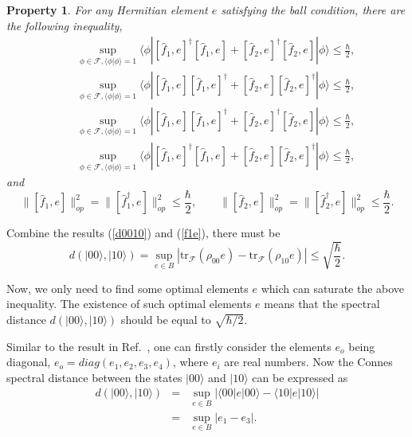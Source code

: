 \documentclass[a4paper,12pt]{article}
\newtheorem{property}{Property}
\begin{document}
\begin{property}
	For any Hermitian element $e$ satisfying the ball condition, there are the following inequality,
	\begin{eqnarray}\label{bc2}
		&&\sup_{\phi\in\mathcal{F},\langle\phi|\phi\rangle=1}
		\!\!\!\!\!\!\langle\phi|[\hat{f}_1,e]^\dag[\hat{f}_1,e]+[\hat{f}_2,e]^\dag[\hat{f}_2,e]|\phi\rangle
		\leqslant\frac{\hbar}{2},
		\nonumber\\
		&&\sup_{\phi\in\mathcal{F},\langle\phi|\phi\rangle=1}
		\!\!\!\!\!\!\langle\phi|[\hat{f}_1,e][\hat{f}_1,e]^\dag+[\hat{f}_2,e][\hat{f}_2,e]^\dag|\phi\rangle
		\leqslant\frac{\hbar}{2},
		\nonumber\\
		&&\sup_{\phi\in\mathcal{F},\langle\phi|\phi\rangle=1}
		\!\!\!\!\!\!\langle\phi|[\hat{f}_1,e][\hat{f}_1,e]^\dag+[\hat{f}_2,e]^\dag[\hat{f}_2,e]|\phi\rangle
		\leqslant\frac{\hbar}{2},\nonumber\\
		&&\sup_{\phi\in\mathcal{F},\langle\phi|\phi\rangle=1}
		\!\!\!\!\!\!\langle\phi|[\hat{f}_1,e]^\dag[\hat{f}_1,e]+[\hat{f}_2,e][\hat{f}_2,e]^\dag|\phi\rangle
		\leqslant\frac{\hbar}{2},
	\end{eqnarray}
	and
	\begin{equation}\label{f1e}
		\big\|[\hat{f}_1,e]\big\|_{op}^2=\big\|[\hat{f}_1^\dag,e]\big\|_{op}^2\leqslant \frac{\hbar}{2},\qquad
		\big\|[\hat{f}_2,e]\big\|_{op}^2=\big\|[\hat{f}_2^\dag,e]\big\|_{op}^2\leqslant \frac{\hbar}{2}.
	\end{equation}
\end{property}

Combine the results (\ref{d0010}) and (\ref{f1e}), there must be
\begin{equation}
	d(|00\rangle, |10\rangle)=\sup_{e\in B}|\mathrm{tr}_\mathcal{F}(\rho_{00} e)-\mathrm{tr}_\mathcal{F}(\rho_{10} e)|\leqslant \sqrt{\frac{\hbar}{2}}.
\end{equation}

Now, we only need to find some optimal elements $e$ which can saturate the above inequality.
The existence of such optimal elements $e$ means that the spectral distance $d(|00\rangle, |10\rangle)$ should be equal to $\sqrt{\hbar/2}$.

Similar to the result in Ref.~\cite{Lin2}, one can firstly consider the elements $e_o$ being diagonal,
$e_o=diag(e_1, e_2, e_3, e_4)$, where $e_i$ are real numbers.
Now the Connes spectral distance between the states $|00 \rangle$ and $|10 \rangle$ can be expressed as
\begin{eqnarray}
	d(|00\rangle, |10\rangle)&=&
	\sup_{e\in B}|\langle 00|e|00\rangle-\langle 10|e|10\rangle|\nonumber\\
	&=&\sup_{e\in B}|e_{1}-e_3|.
\end{eqnarray}
\end{document}
